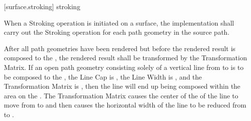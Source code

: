  [surface.stroking] { stroking}

\pnum
When a Stroking operation is initiated on a surface, the implementation shall carry out the Stroking operation for each path geometry in the source path.

\pnum
After all path geometries have been rendered but before the rendered result is composed to the \underlyingsurface, the rendered result shall be transformed by the Transformation Matrix.
\enterexample
If an open path geometry consisting solely of a vertical line from  to  is to be composed to the \underlyingsurface, the Line Cap is , the Line Width is , and the Transformation Matrix is , then the line will end up being composed within the area  on the \underlyingsurface. The Transformation Matrix causes the center of the \xaxis of the line to move from  to  and then causes the horizontal width of the line to be reduced from  to .
\exitexample

